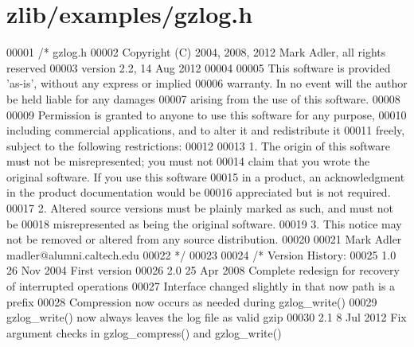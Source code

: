 \hypertarget{zlib_2examples_2gzlog_8h_source}{}\section{zlib/examples/gzlog.h}
\label{zlib_2examples_2gzlog_8h_source}

\begin{DoxyCode}
00001 \textcolor{comment}{/* gzlog.h}
00002 \textcolor{comment}{  Copyright (C) 2004, 2008, 2012 Mark Adler, all rights reserved}
00003 \textcolor{comment}{  version 2.2, 14 Aug 2012}
00004 \textcolor{comment}{}
00005 \textcolor{comment}{  This software is provided 'as-is', without any express or implied}
00006 \textcolor{comment}{  warranty.  In no event will the author be held liable for any damages}
00007 \textcolor{comment}{  arising from the use of this software.}
00008 \textcolor{comment}{}
00009 \textcolor{comment}{  Permission is granted to anyone to use this software for any purpose,}
00010 \textcolor{comment}{  including commercial applications, and to alter it and redistribute it}
00011 \textcolor{comment}{  freely, subject to the following restrictions:}
00012 \textcolor{comment}{}
00013 \textcolor{comment}{  1. The origin of this software must not be misrepresented; you must not}
00014 \textcolor{comment}{     claim that you wrote the original software. If you use this software}
00015 \textcolor{comment}{     in a product, an acknowledgment in the product documentation would be}
00016 \textcolor{comment}{     appreciated but is not required.}
00017 \textcolor{comment}{  2. Altered source versions must be plainly marked as such, and must not be}
00018 \textcolor{comment}{     misrepresented as being the original software.}
00019 \textcolor{comment}{  3. This notice may not be removed or altered from any source distribution.}
00020 \textcolor{comment}{}
00021 \textcolor{comment}{  Mark Adler    madler@alumni.caltech.edu}
00022 \textcolor{comment}{ */}
00023 
00024 \textcolor{comment}{/* Version History:}
00025 \textcolor{comment}{   1.0  26 Nov 2004  First version}
00026 \textcolor{comment}{   2.0  25 Apr 2008  Complete redesign for recovery of interrupted operations}
00027 \textcolor{comment}{                     Interface changed slightly in that now path is a prefix}
00028 \textcolor{comment}{                     Compression now occurs as needed during gzlog\_write()}
00029 \textcolor{comment}{                     gzlog\_write() now always leaves the log file as valid gzip}
00030 \textcolor{comment}{   2.1   8 Jul 2012  Fix argument checks in gzlog\_compress() and gzlog\_write()}

\end{DoxyCode}
